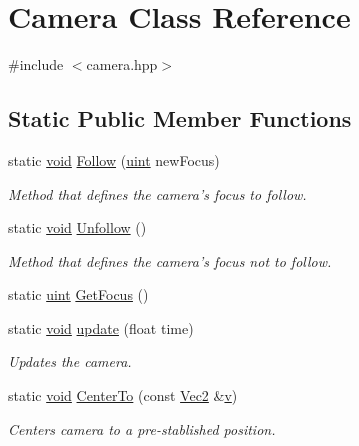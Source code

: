 \hypertarget{class_camera}{\section{Camera Class Reference}
\label{class_camera}
}


{\ttfamily \#include $<$camera.\-hpp$>$}

\subsection*{Static Public Member Functions}
\begin{DoxyCompactItemize}
\item 
static \hyperlink{_s_d_l__opengles2__gl2ext_8h_ae5d8fa23ad07c48bb609509eae494c95}{void} \hyperlink{class_camera_a7727d0873fbed2e6a9c11b8b83e7124b}{Follow} (\hyperlink{common_8hpp_a69aa29b598b851b0640aa225a9e5d61d}{uint} new\-Focus)
\begin{DoxyCompactList}\small\item\em Method that defines the camera's focus to follow. \end{DoxyCompactList}\item 
static \hyperlink{_s_d_l__opengles2__gl2ext_8h_ae5d8fa23ad07c48bb609509eae494c95}{void} \hyperlink{class_camera_ab04eb4c102fac35e149abb9a4320d578}{Unfollow} ()
\begin{DoxyCompactList}\small\item\em Method that defines the camera's focus not to follow. \end{DoxyCompactList}\item 
static \hyperlink{common_8hpp_a69aa29b598b851b0640aa225a9e5d61d}{uint} \hyperlink{class_camera_a6cb4438420649750d4f361817cdf926f}{Get\-Focus} ()
\item 
static \hyperlink{_s_d_l__opengles2__gl2ext_8h_ae5d8fa23ad07c48bb609509eae494c95}{void} \hyperlink{class_camera_acac73848caa61e2aeb54a831f016d69c}{update} (float time)
\begin{DoxyCompactList}\small\item\em Updates the camera. \end{DoxyCompactList}\item 
static \hyperlink{_s_d_l__opengles2__gl2ext_8h_ae5d8fa23ad07c48bb609509eae494c95}{void} \hyperlink{class_camera_a708e94ea80e72027bf1017a48bac9f71}{Center\-To} (const \hyperlink{class_vec2}{Vec2} \&\hyperlink{_s_d_l__opengl_8h_a10a82eabcb59d2fcd74acee063775f90}{v})
\begin{DoxyCompactList}\small\item\em Centers camera to a pre-\/stablished position. \end{DoxyCompactList}\item 

\end{DoxyCompactItemize}
